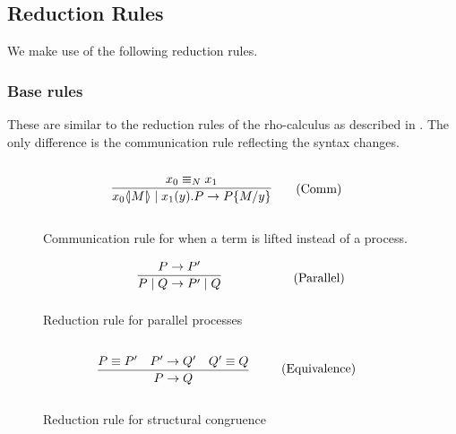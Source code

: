\FloatBarrier

\subsection{Reduction Rules}
We make use of the following reduction rules.

\subsubsection{Base rules}
These are similar to the reduction rules of the rho-calculus as described in \citep{Meredith2005}. The only difference is the communication rule reflecting the syntax changes.

\begin{figure}[h]
	\begin{align}
	& \infrule{x_0 \equiv_N x_1}{\lift{x_0}{M}\para\inp{x_1}{y}P\ra P\{M/y\}} \tag{Comm}
	\end{align}
	\caption{Communication rule for when a term is lifted instead of a process.}
	\label{fig:com}
\end{figure}


\begin{figure}[!h]
	\begin{align}
	& \infrule{P\ra P'}{P\para Q\ra P'\para Q} \tag{Parallel}
	\end{align}
	\caption{Reduction rule for parallel processes}
	\label{fig:para}
\end{figure}

\begin{figure}[h]
	\begin{align}
		& \infrule{P\equiv P'\quad P'\ra Q'\quad Q'\equiv Q}{P\ra Q} \tag{Equivalence}
	\end{align}
	\caption{Reduction rule for structural congruence}
	\label{fig:equi}
\end{figure}

